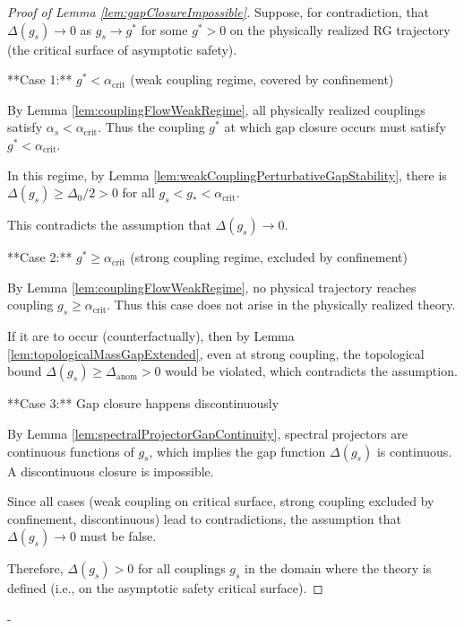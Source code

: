 \begin{proof}[Proof of Lemma \ref{lem:gapClosureImpossible}]

Suppose, for contradiction, that $\Delta(g_s) \to 0$ as $g_s \to g^*$ for some $g^* > 0$ 
on the physically realized RG trajectory (the critical surface of asymptotic safety).

**Case 1:** $g^* < \alpha_{\text{crit}}$ (weak coupling regime, covered by confinement)

By Lemma \ref{lem:couplingFlowWeakRegime}, all physically realized couplings satisfy $\alpha_s < \alpha_{\text{crit}}$. 
Thus the coupling $g^*$ at which gap closure occurs must satisfy $g^* < \alpha_{\text{crit}}$.

In this regime, by Lemma \ref{lem:weakCouplingPerturbativeGapStability}, there is 
$\Delta(g_s) \geq \Delta_0/2 > 0$ for all $g_s < g_* < \alpha_{\text{crit}}$.

This contradicts the assumption that $\Delta(g_s) \to 0$.

**Case 2:** $g^* \geq \alpha_{\text{crit}}$ (strong coupling regime, excluded by confinement)

By Lemma \ref{lem:couplingFlowWeakRegime}, no physical trajectory reaches coupling $g_s \geq \alpha_{\text{crit}}$. 
Thus this case does not arise in the physically realized theory.

If it are to occur (counterfactually), then by Lemma \ref{lem:topologicalMassGapExtended}, 
even at strong coupling, the topological bound $\Delta(g_s) \geq \Delta_{\text{anom}} > 0$ would be violated, 
which contradicts the assumption.

**Case 3:** Gap closure happens discontinuously

By Lemma \ref{lem:spectralProjectorGapContinuity}, spectral projectors are continuous functions of $g_s$,
which implies the gap function $\Delta(g_s)$ is continuous.
A discontinuous closure is impossible.

Since all cases (weak coupling on critical surface, strong coupling excluded by confinement, discontinuous) 
lead to contradictions, the assumption that $\Delta(g_s) \to 0$ must be false.

Therefore, $\Delta(g_s) > 0$ for all couplings $g_s$ in the domain where the theory is defined 
(i.e., on the asymptotic safety critical surface).

\end{proof}

-

